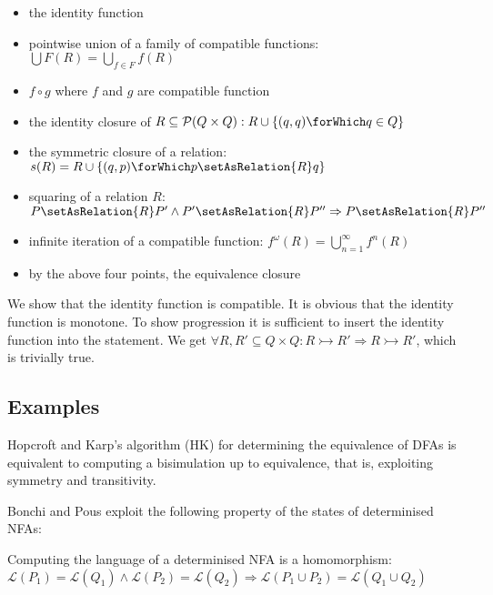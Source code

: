 \begin{itemize}
  \item the identity function
  \item pointwise union of a family of compatible functions: \\
          $\bigcup F(R) = \bigcup_{f \in F} f(R)$
  \item $f \circ g$ where $f$ and $g$ are compatible function
  \item the identity closure of $R \subseteq \mathcal{P}(Q \times Q): R \cup \{(q, q)\forWhich q \in Q\}$
  \item the symmetric closure of a relation: $s(R) = R \cup \{(q, p) \forWhich p \setAsRelation{R} q\}$
  \item squaring of a relation $R$: $P \setAsRelation{R} P' \land P' \setAsRelation{R} P'' \Rightarrow P \setAsRelation{R} P''$
  \item infinite iteration of a compatible function: $f^\omega(R) = \bigcup_{n = 1}^{\infty} f^n(R)$
  \item by the above four points, the equivalence closure
\end{itemize}

\begin{example}
  We show that the identity function is compatible.
  It is obvious that the identity function is monotone.
  To show progression it is sufficient to insert the identity function into the
    statement.
  We get
    $\forall R, R' \subseteq Q \times Q: R \rightarrowtail R'
      \Rightarrow R \rightarrowtail R'$,
  which is trivially true.
\end{example}


\subsection{Examples}

Hopcroft and Karp's algorithm (HK) for determining the equivalence of DFAs is
  equivalent to computing a bisimulation up to equivalence, that is, exploiting
  symmetry and transitivity.

Bonchi and Pous exploit the following property of the states of determinised NFAs:

\begin{corollary}
  Computing the language of a determinised NFA is a homomorphism:\\
  $\mathcal{L}(P_1) = \mathcal{L}(Q_1) \land \mathcal{L}(P_2) = \mathcal{L}(Q_2)
    \Rightarrow \mathcal{L}(P_1 \cup P_2) = \mathcal{L}(Q_1 \cup Q_2)$
\end{corollary}

